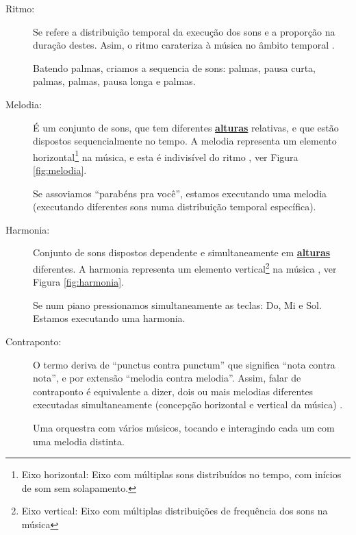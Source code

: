 \begin{description}
\item [Ritmo:] \label{sec:pos:Ritmo}
Se refere a distribuição temporal da execução dos sons e a proporção na duração destes. 
Asim, o ritmo carateriza à música no âmbito temporal \cite[pp. 11]{medteoria}.
\begin{example}
Batendo palmas, criamos a sequencia de sons: palmas, pausa curta, palmas, palmas, pausa longa e palmas.
\end{example} 
\item [Melodia:] \label{sec:pos:Melodia}
É um conjunto de sons, que tem diferentes \hyperref[sec:pos:Altura]{\textbf{alturas}} relativas, 
e que estão dispostos sequencialmente no tempo. 
A melodia representa um elemento horizontal\footnote{\label{eixohor}Eixo horizontal: 
Eixo com múltiplas sons distribuídos no tempo, com inícios de som sem solapamento.} na música,
e esta é indivisível do ritmo \cite[pp. 517]{apel1969harvard} \cite[pp. 11]{medteoria}, ver Figura \ref{fig:melodia}.
\begin{example}
Se assoviamos ``parabéns pra você'', estamos executando uma melodia 
(executando diferentes sons numa distribuição temporal específica).
\end{example} 
\item [Harmonia:] \label{sec:pos:Harmonia}
Conjunto de sons dispostos dependente e simultaneamente em \hyperref[sec:pos:Altura]{\textbf{alturas}} diferentes.
A harmonia representa um elemento vertical\footnote{\label{eixover}Eixo vertical: 
Eixo com múltiplas distribuições de frequência dos sons na música} 
na música \cite[pp. 371]{apel1969harvard} \cite[pp. 8]{cardoso1973curso} \cite[pp. 11]{medteoria}, 
ver Figura \ref{fig:harmonia}. 
\begin{example}
Se num piano pressionamos simultaneamente as teclas: Do, Mi e Sol. Estamos executando uma harmonia.
\end{example} 
\item [Contraponto:] \label{sec:pos:Contraponto}
O termo deriva de ``punctus contra punctum'' que significa ``nota contra nota'', 
e por extensão ``melodia contra melodia''. 
Assim, falar de contraponto é equivalente a dizer, dois ou mais melodias diferentes executadas simultaneamente  
(concepção horizontal e vertical da música)  \cite[pp. 208]{apel1969harvard} \cite[pp. 11]{medteoria}.
\begin{example}
Uma orquestra com vários músicos, tocando e interagindo cada um com uma melodia distinta.
\end{example} 
\end{description}


